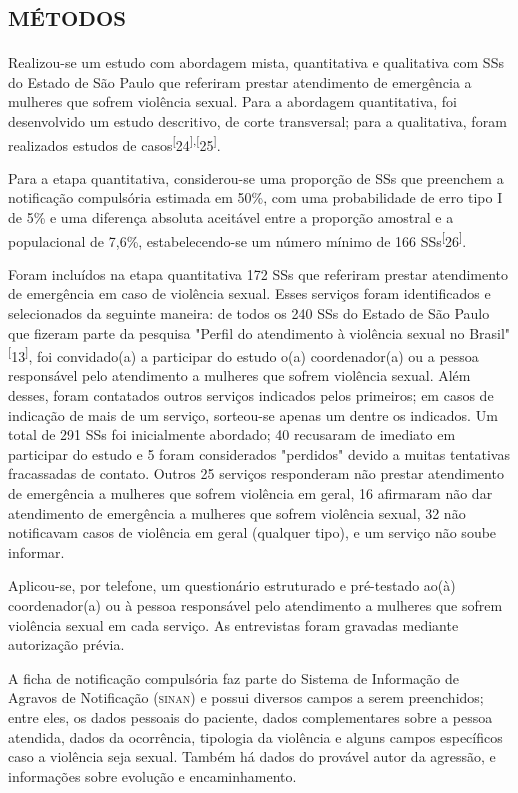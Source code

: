 \documentclass{article}
\begin{document}
\section{\textsc{métodos}}

Realizou-se um estudo com abordagem mista, quantitativa e qualitativa com SSs do
Estado de São Paulo que referiram prestar atendimento de emergência a mulheres
que sofrem violência sexual. Para a abordagem quantitativa, foi desenvolvido um
estudo descritivo, de corte transversal; para a qualitativa, foram realizados
estudos de casos\textsuperscript{[}24\textsuperscript{]}\textsuperscript{,}\textsuperscript{[}25\textsuperscript{]}.

Para a etapa quantitativa, considerou-se uma proporção de SSs que preenchem a
notificação compulsória estimada em 50\%, com uma probabilidade de erro tipo I
de 5\% e uma diferença absoluta aceitável entre a proporção amostral e a
populacional de 7,6\%, estabelecendo-se um número mínimo de 166
SSs\textsuperscript{[}26\textsuperscript{]}.

Foram incluídos na etapa quantitativa 172 SSs que referiram prestar atendimento
de emergência em caso de violência sexual. Esses serviços foram identificados e
selecionados da seguinte maneira: de todos os 240 SSs do Estado de São Paulo que
fizeram parte da pesquisa "Perfil do atendimento à violência sexual no
Brasil"\textsuperscript{[}13\textsuperscript{]}, foi convidado(a) a participar do estudo o(a) coordenador(a) ou a pessoa
responsável pelo atendimento a mulheres que sofrem violência sexual. Além
desses, foram contatados outros serviços indicados pelos primeiros; em casos de
indicação de mais de um serviço, sorteou-se apenas um dentre os indicados. Um
total de 291 SSs foi inicialmente abordado; 40 recusaram de imediato em
participar do estudo e 5 foram considerados "perdidos" devido a muitas
tentativas fracassadas de contato. Outros 25 serviços responderam não prestar
atendimento de emergência a mulheres que sofrem violência em geral, 16 afirmaram
não dar atendimento de emergência a mulheres que sofrem violência sexual, 32 não
notificavam casos de violência em geral (qualquer tipo), e um serviço não soube
informar.

Aplicou-se, por telefone, um questionário estruturado e pré-testado ao(à)
coordenador(a) ou à pessoa responsável pelo atendimento a mulheres que sofrem
violência sexual em cada serviço. As entrevistas foram gravadas mediante
autorização prévia.

A ficha de notificação compulsória faz parte do Sistema de Informação de Agravos
de Notificação (\textsc{sinan}) e possui diversos campos a serem preenchidos; entre eles,
os dados pessoais do paciente, dados complementares sobre a pessoa atendida,
dados da ocorrência, tipologia da violência e alguns campos específicos caso a
violência seja sexual. Também há dados do provável autor da agressão, e
informações sobre evolução e encaminhamento.
\end{document}
